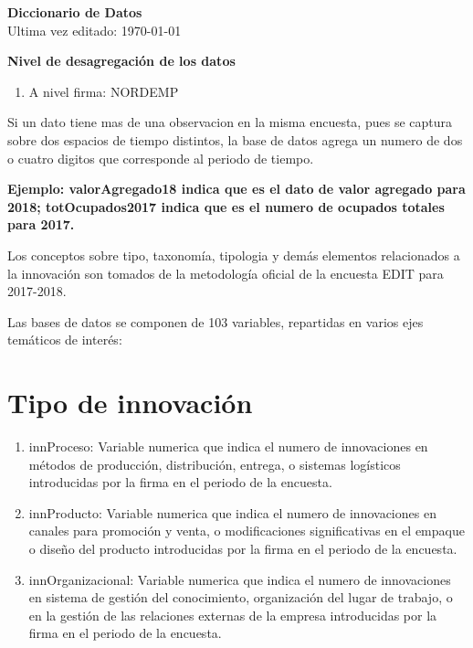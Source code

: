 \documentclass[12pt,a4paper]{article}
\begin{document}
\begin{center}
	\textbf{Diccionario de Datos} \\
	Ultima vez editado: \today
\end{center}
\vspace{10mm}

\textbf{Nivel de desagregación de los datos}
\begin{enumerate}
	\item A nivel firma: NORDEMP
\end{enumerate}

Si un dato tiene mas de una observacion en la misma encuesta, pues se captura sobre dos espacios de tiempo distintos, la base de datos agrega un numero de dos o cuatro digitos que corresponde al periodo de tiempo. 

\begin{center}
	\textbf{\textbf{Ejemplo}: valorAgregado18 indica que es el dato de valor agregado para 2018; totOcupados2017 indica que es el numero de ocupados totales para 2017.}
\end{center}

Los conceptos sobre tipo, taxonomía, tipologia y demás elementos relacionados a la innovación son tomados de la metodología oficial de la encuesta EDIT para 2017-2018.

Las bases de datos se componen de 103 variables, repartidas en varios ejes temáticos de interés:

\section{Tipo de innovación}

\begin{enumerate}
	\item innProceso: Variable numerica que indica el numero de innovaciones en métodos de producción, distribución, entrega, o sistemas logísticos introducidas por la firma en el periodo de la encuesta.
	\item innProducto: Variable numerica que indica el numero de innovaciones en canales para promoción y venta, o modificaciones significativas en el empaque o diseño del producto introducidas por la firma en el periodo de la encuesta.
	\item innOrganizacional: Variable numerica que indica el numero de innovaciones en sistema de gestión del conocimiento, organización del lugar de trabajo, o en la gestión de las relaciones externas de la empresa introducidas por la firma en el periodo de la encuesta.
\end{enumerate}
\end{document}
